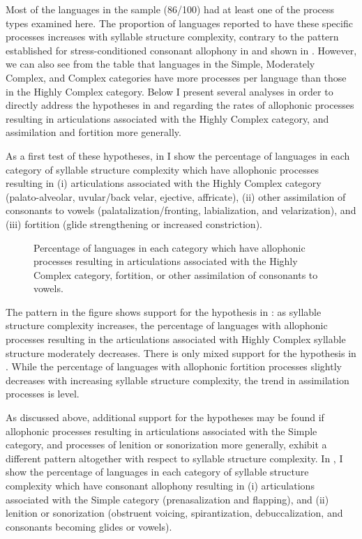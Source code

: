 Most of the languages in the sample (86/100) had at least one of the process types examined here. The proportion of languages reported to have these specific processes increases with syllable structure complexity, contrary to the pattern established for stress-conditioned consonant allophony in  and shown in . However, we can also see from the table that languages in the Simple, Moderately Complex, and Complex categories have more processes per language than those in the Highly Complex category. Below I present several analyses in order to directly address the hypotheses in  and  regarding the rates of allophonic processes resulting in articulations associated with the Highly Complex category, and assimilation and fortition more generally.

  As a first test of these hypotheses, in  I show the percentage of languages in each category of syllable structure complexity which have allophonic processes resulting in (i) articulations associated with the Highly Complex category (palato-alveolar, uvular/back velar, ejective, affricate), (ii) other assimilation of consonants to vowels (palatalization/fronting, labialization, and velarization), and (iii) fortition (glide strengthening or increased constriction).

\begin{figure}
\caption{\label{fig:7.2} Percentage of languages in each category which have allophonic processes resulting in articulations associated with the Highly Complex category, fortition, or other assimilation of consonants to vowels.}
\end{figure}

  The pattern in the figure shows support for the hypothesis in : as syllable structure complexity increases, the percentage of languages with allophonic processes resulting in the articulations associated with Highly Complex syllable structure moderately decreases. There is only mixed support for the hypothesis in . While the percentage of languages with allophonic fortition processes slightly decreases with increasing syllable structure complexity, the trend in assimilation processes is level.

  As discussed above, additional support for the hypotheses may be found if allophonic processes resulting in articulations associated with the Simple category, and processes of lenition or sonorization more generally, exhibit a different pattern altogether with respect to syllable structure complexity. In , I show the percentage of languages in each category of syllable structure complexity which have consonant allophony resulting in (i) articulations associated with the Simple category (prenasalization and flapping), and (ii) lenition or sonorization (obstruent voicing, spirantization, debuccalization, and consonants becoming glides or vowels).

